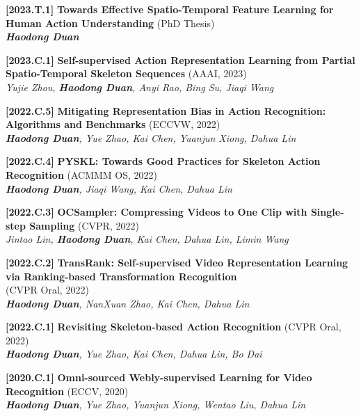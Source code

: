\documentclass{resume}
\newcommand{\itemgap}{\vspace{-1mm}}%
\begin{document}
\textbf{[2023.T.1]} \textbf{Towards Effective Spatio-Temporal Feature Learning for Human Action
Understanding} (PhD Thesis) \\
\textit{\textbf{Haodong Duan}} \\

\itemgap

\textbf{[2023.C.1]} \textbf{Self-supervised Action Representation Learning from Partial Spatio-Temporal Skeleton Sequences} (AAAI, 2023) \\
\textit{Yujie Zhou, \textbf{Haodong Duan}, Anyi Rao, Bing Su, Jiaqi Wang} \\
 
\itemgap

\textbf{[2022.C.5]} \textbf{Mitigating Representation Bias in Action Recognition: Algorithms and Benchmarks} (ECCVW, 2022) \\
\textit{\textbf{Haodong Duan}, Yue Zhao, Kai Chen, Yuanjun Xiong, Dahua Lin} \\

\itemgap

\textbf{[2022.C.4]} \textbf{PYSKL: Towards Good Practices for Skeleton Action Recognition} (ACMMM OS, 2022) \\ 
\textit{\textbf{Haodong Duan}, Jiaqi Wang, Kai Chen, Dahua Lin} \\

\itemgap

\textbf{[2022.C.3]} \textbf{OCSampler: Compressing Videos to One Clip with Single-step Sampling} (CVPR, 2022) \\ 
\textit{Jintao Lin, \textbf{Haodong Duan}, Kai Chen, Dahua Lin, Limin Wang} \\

\itemgap

\textbf{[2022.C.2]} \textbf{TransRank: Self-supervised Video Representation Learning via Ranking-based Transformation Recognition} \\
(CVPR Oral, 2022) \\
\textit{\textbf{Haodong Duan}, NanXuan Zhao, Kai Chen, Dahua Lin} \\

\itemgap

\textbf{[2022.C.1]} \textbf{Revisiting Skeleton-based Action Recognition} (CVPR Oral, 2022) \\ 
\textit{\textbf{Haodong Duan}, Yue Zhao, Kai Chen, Dahua Lin, Bo Dai} \\

\itemgap

\textbf{[2020.C.1]} \textbf{Omni-sourced Webly-supervised Learning for Video Recognition} (ECCV, 2020) \\
\textit{\textbf{Haodong Duan},  Yue Zhao, Yuanjun Xiong, Wentao Liu, Dahua Lin} \\
\end{document}
